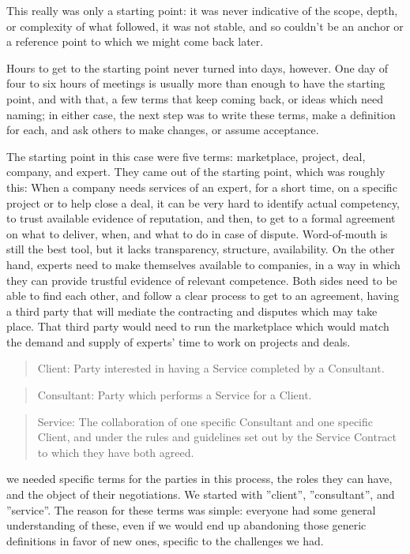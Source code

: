 \documentclass[graybox,envcountchap,sectrefs]{svmono}
\newcommand{\newterm}[1]{\begin{quote}\textsf{#1}\end{quote}}
\newcommand{\nterm}[1]{\textsf{#1}}
\begin{document}
This really was only a starting point: it was never indicative of the scope, depth, or complexity of what followed, it was not stable, and so couldn't be an anchor or a reference point to which we might come back later. 

Hours to get to the starting point never turned into days, however. One day of four to six hours of meetings is usually more than enough to have the starting point, and with that, a few terms that keep coming back, or ideas which need naming; in either case, the next step was to write these terms, make a definition for each, and ask others to make changes, or assume acceptance. 

The starting point in this case were five terms: \nterm{marketplace}, \nterm{project}, \nterm{deal}, \nterm{company}, and \nterm{expert}. They came out of the starting point, which was roughly this: When a company needs services of an expert, for a short time, on a specific project or to help close a deal, it can be very hard to identify actual competency, to trust available evidence of reputation, and then, to get to a formal agreement on what to deliver, when, and what to do in case of dispute. Word-of-mouth is still the best tool, but it lacks transparency, structure, availability. On the other hand, experts need to make themselves available to companies, in a way in which they can provide trustful evidence of relevant competence. Both sides need to be able to find each other, and follow a clear process to get to an agreement, having a third party that will mediate the contracting and disputes which may take place. That third party would need to run the marketplace which would match the demand and supply of experts' time to work on projects and deals.



\newterm{Client: Party interested in having a Service completed by a Consultant.}
\newterm{Consultant: Party which performs a Service for a Client.}
\newterm{Service: The collaboration of one specific Consultant and one specific Client, and under the rules and guidelines set out by the Service Contract to which they have both agreed.}



we needed specific terms for the parties in this process, the roles they can have, and the object of their negotiations. We started with ''client'', ''consultant'', and ''service''. The reason for these terms was simple: everyone had some general understanding of these, even if we would end up abandoning those generic definitions in favor of new ones, specific to the challenges we had. 
\end{document}
